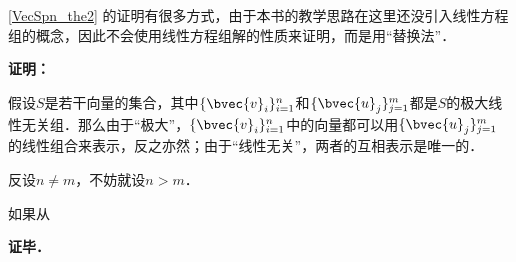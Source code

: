 \autoref{VecSpn_the2} 的证明有很多方式，由于本书的教学思路在这里还没引入线性方程组的概念，因此不会使用线性方程组解的性质来证明，而是用“替换法”．

\textbf{证明：}

假设$S$是若干向量的集合，其中$\{\bvec{v}_i\}_{i=1}^n$和$\{\bvec{u}_j\}^m_{j=1}$都是$S$的极大线性无关组．那么由于“极大”，$\{\bvec{v}_i\}_{i=1}^n$中的向量都可以用$\{\bvec{u}_j\}^m_{j=1}$的线性组合来表示，反之亦然；由于“线性无关”，两者的互相表示是唯一的．

反设$n\not=m$，不妨就设$n>m$．

如果从

\textbf{证毕．}
